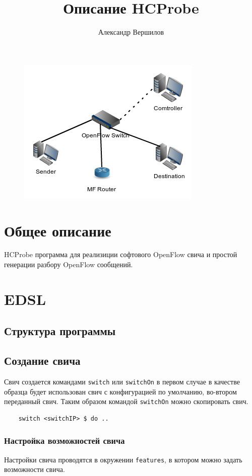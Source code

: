 \documentclass[9pt,a4paper]{article}
\title{Описание HCProbe}
\author{Александр Вершилов}
\begin{document}
\maketitle
\begin{figure}[!h]
   \centering 
   \includegraphics[width=0.3\columnwidth]{images/testcfg2.png}
\end{figure}                                                        

\tableofcontents

\pagebreak
\section{Общее описание}
HCProbe программа для реализиции софтового OpenFlow свича и простой
генерации разбору OpenFlow сообщений.

\section{EDSL}
\subsection{Структура программы}
\subsection{Создание свича}
Свич создается командами \lstinline!switch! или \lstinline!switchOn! в первом случае
в качестве образца будет использован свич с конфигурацией по умолчанию, во-втором 
переданный свич. Таким образом командой \lstinline!switchOn! можно скопировать свич.

\begin{lstlisting}
    switch <switchIP> $ do ..
\end{lstlisting}

\subsubsection{Настройка возможностей свича}

Настройки свича проводятся в окружении \lstinline!features!, в котором можно задать
возможности свича.
\end{document}
